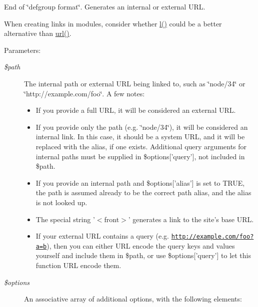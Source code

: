 End of \char`\"{}defgroup format\char`\"{}. Generates an internal or external URL.

When creating links in modules, consider whether \hyperlink{common_8inc_b1b47d5ab720066df684c335eda75cfd}{l()} could be a better alternative than \hyperlink{common_8inc_7ef60c766e2d09e18b866dacf6b9eb1f}{url()}.

\begin{Desc}
\item[Parameters:]
\begin{description}
\item[{\em \$path}]The internal path or external URL being linked to, such as \char`\"{}node/34\char`\"{} or \char`\"{}http://example.com/foo\char`\"{}. A few notes:\begin{itemize}
\item If you provide a full URL, it will be considered an external URL.\item If you provide only the path (e.g. \char`\"{}node/34\char`\"{}), it will be considered an internal link. In this case, it should be a system URL, and it will be replaced with the alias, if one exists. Additional query arguments for internal paths must be supplied in \$options\mbox{[}'query'\mbox{]}, not included in \$path.\item If you provide an internal path and \$options\mbox{[}'alias'\mbox{]} is set to TRUE, the path is assumed already to be the correct path alias, and the alias is not looked up.\item The special string '$<$front$>$' generates a link to the site's base URL.\item If your external URL contains a query (e.g. \href{http://example.com/foo?a=b}{\tt http://example.com/foo?a=b}), then you can either URL encode the query keys and values yourself and include them in \$path, or use \$options\mbox{[}'query'\mbox{]} to let this function URL encode them. \end{itemize}
\item[{\em \$options}]An associative array of additional options, with the following elements:\begin{itemize}

\end{itemize}
\end{description}
\end{Desc}
